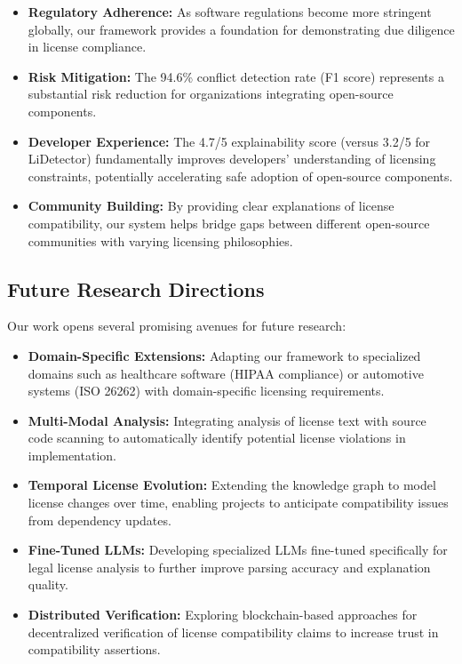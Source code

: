 \documentclass[12pt]{article}
\begin{document}
\begin{itemize}
    \item \textbf{Regulatory Adherence:} As software regulations become more stringent globally, our framework provides a foundation for demonstrating due diligence in license compliance.
    
    \item \textbf{Risk Mitigation:} The 94.6\% conflict detection rate (F1 score) represents a substantial risk reduction for organizations integrating open-source components.
    
    \item \textbf{Developer Experience:} The 4.7/5 explainability score (versus 3.2/5 for LiDetector) fundamentally improves developers' understanding of licensing constraints, potentially accelerating safe adoption of open-source components.
    
    \item \textbf{Community Building:} By providing clear explanations of license compatibility, our system helps bridge gaps between different open-source communities with varying licensing philosophies.
\end{itemize}

\subsection{Future Research Directions}

Our work opens several promising avenues for future research:

\begin{itemize}
    \item \textbf{Domain-Specific Extensions:} Adapting our framework to specialized domains such as healthcare software (HIPAA compliance) or automotive systems (ISO 26262) with domain-specific licensing requirements.
    
    \item \textbf{Multi-Modal Analysis:} Integrating analysis of license text with source code scanning to automatically identify potential license violations in implementation.
    
    \item \textbf{Temporal License Evolution:} Extending the knowledge graph to model license changes over time, enabling projects to anticipate compatibility issues from dependency updates.
    
    \item \textbf{Fine-Tuned LLMs:} Developing specialized LLMs fine-tuned specifically for legal license analysis to further improve parsing accuracy and explanation quality.
    
    \item \textbf{Distributed Verification:} Exploring blockchain-based approaches for decentralized verification of license compatibility claims to increase trust in compatibility assertions.
\end{itemize}
\end{document}
